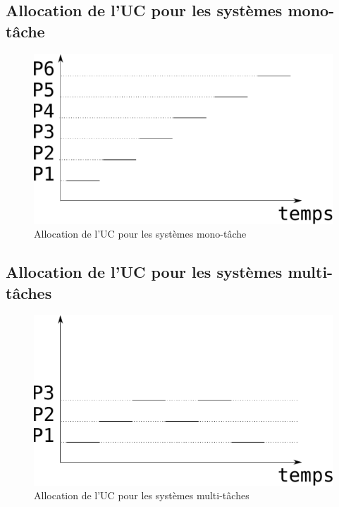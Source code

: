 \begin{frame}{\sectitle}
\def\subsectitle{Allocation de l'UC pour les systèmes mono-tâche}
\subsection{\subsectitle}
\begin{figure}
\begin{center}
\includegraphics[width=\textwidth]{images/monoTache.pdf}
\end{center}
\caption{\subsectitle}
\end{figure}
\end{frame}

\begin{frame}{\sectitle}
\def\subsectitle{Allocation de l'UC pour les systèmes multi-tâches}
\subsection{\subsectitle}
\begin{figure}
\begin{center}
\includegraphics[width=\textwidth]{images/multiTaches.pdf}
\end{center}
\caption{\subsectitle}
\end{figure}

\end{frame}

